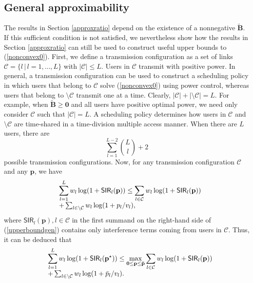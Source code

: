 \documentclass[10pt,twocolumn]{IEEEtran}
\newcommand{\0}{\mathbf{0}}
\newcommand{\1}{\mathbf{1}}
\begin{document}
\subsection{General approximability}
\label{genapprox}
The results in Section \ref{approxratio} depend on the existence of a nonnegative $\tilde{\mathbf{B}}$. If this sufficient condition is not satisfied, we nevertheless show how the results in Section \ref{approxratio} can still be used to construct useful upper bounds to (\ref{nonconvex0}). First, we define a transmission configuration as a set of links $\mathcal C=\{l\,|\,l=1,\dots,L\}$ with $|\mathcal{C}|\le L$. Users in $\mathcal{C}$ transmit with positive power. In general, a transmission configuration can be used to construct a scheduling policy in which users that belong to $\mathcal{C}$ solve (\ref{nonconvex0}) using power control, whereas users that belong to $\setminus \mathcal{C}$ transmit one at a time. Clearly, $|\mathcal{C}|+|\setminus \mathcal{C}|=L$. For example, when $\mathbf{\tilde{B}}\ge\mathbf{0}$ and all users have positive optimal power, we need only consider $\mathcal{C}$ such that $|\mathcal{C}|=L$. A scheduling policy determines how users in $\mathcal{C}$ and $\setminus \mathcal{C}$ are time-shared in a time-division multiple access manner. When there are $L$ users, there are
\begin{equation}
\sum_{l=1}^{L-2} {L \choose l} + 2
\end{equation}
possible transmission configurations. Now, for any transmission configuration $\mathcal{C}$ and any $\mathbf{p}$, we have
\begin{equation}
\label{upperboundgen}
\begin{array}
[c]{rl}
& \displaystyle  \sum_{l=1}^{L} w_l \log(1+\mathsf{SIR}_l(\mathbf{p})) \le \sum_{l \in \mathcal{C}} w_l \log(1+\mathsf{SIR}_l(\mathbf{p})) \\
& + \sum_{l \in \setminus \mathcal{C}} w_l \log(1+ p_l/v_l),
\end{array}
\end{equation}
where $\mathsf{SIR}_l(\mathbf{p}), l \in \mathcal{C}$ in the first summand on the right-hand side of (\ref{upperboundgen}) contains only interference terms coming from users in $\mathcal{C}$. Thus, it can be deduced that
\begin{equation}
\begin{array}
[c]{rl}
& \displaystyle \sum_{l=1}^{L} w_l \log(1+\mathsf{SIR}_l(\mathbf{p}^{\star})) \le \displaystyle \max_{\mathbf{0} \le \mathbf{p} \le \mathbf{\bar{p}}} \sum_{l \in \mathcal{C}} w_l \log(1+\mathsf{SIR}_l(\mathbf{p})) \\
& + \sum_{l \in \setminus \mathcal{C}} w_l \log(1+ \bar{p}_l/v_l).
\end{array}
\end{equation}
\end{document}

